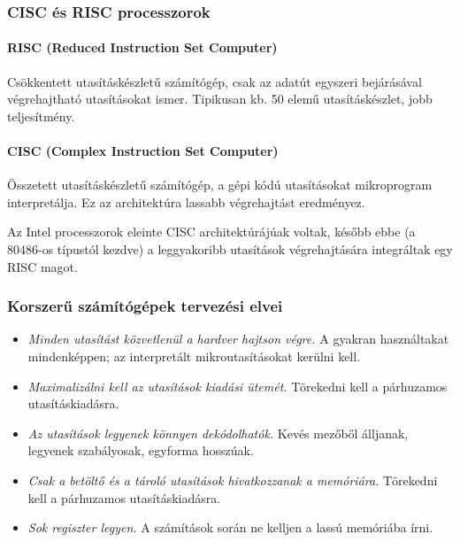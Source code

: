 \documentclass[a4paper]{article}
\begin{document}
\subsubsection{CISC és RISC processzorok}

\paragraph{RISC (Reduced Instruction Set Computer)} Csökkentett utasításkészletű számítógép, csak az adatút egyszeri bejárásával végrehajtható utasításokat ismer. Tipikusan kb. 50 elemű utasításkészlet, jobb teljesítmény.

\paragraph{CISC (Complex Instruction Set Computer)} Összetett utasításkészletű számítógép, a gépi kódú utasításokat mikroprogram interpretálja. Ez az architektúra lassabb végrehajtást eredményez.

Az Intel processzorok eleinte CISC architektúrájúak voltak, később ebbe (a 80486-os típustól kezdve) a leggyakoribb utasítások végrehajtására integráltak egy RISC magot.

\subsubsection{Korszerű számítógépek tervezési elvei}

\begin{itemize}
	\item \emph{Minden utasítást közvetlenül a hardver hajtson végre.} A gyakran használtakat mindenképpen; az interpretált mikroutasításokat kerülni kell.
	\item \emph{Maximalizálni kell az utasítások kiadási ütemét.} Törekedni kell a párhuzamos utasításkiadásra.
	\item \emph{Az utasítások legyenek könnyen dekódolhatók.} Kevés mezőből álljanak, legyenek szabályosak, egyforma hosszúak.
	\item \emph{Csak a betöltő és a tároló utasítások hivatkozzanak a memóriára.} Törekedni kell a párhuzamos utasításkiadásra.
	\item \emph{Sok regiszter legyen.} A számítások során ne kelljen a lassú memóriába írni.
\end{itemize}
\end{document}
